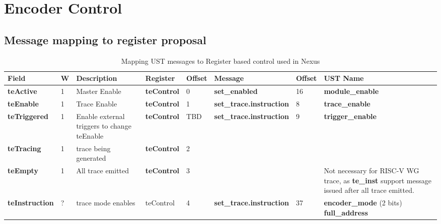 \chapter{Encoder Control} \label{encoderControl}

\section{Message mapping to register proposal} \label{sec:messageToRegiser}

\begin{table}[htp]
  \tiny
  \centering
  \caption{Mapping UST messages to Register based control used in Nexus}
  \label{tab:te_control}
  \begin{tabulary}{\textwidth}{|l|l|p{15mm}|l|p{10mm}|l|p{15mm}|p{15mm}}

    \hline
    {\bf Field} & {\bf W} & {\bf Description} & {\bf Register} & {\bf Offset} & {\bf Message} & {\bf Offset} & {\bf UST Name} \\
    \hline
    \textbf {teActive} & 1 & Master Enable & \textbf {teControl} & 0 & \textbf {set\_enabled} & 16 & \textbf {module\_enable}\\
    \hline  
    \textbf {teEnable} & 1 & Trace Enable & \textbf{teControl} & 1 & \textbf {set\_trace.instruction} & 8 & \textbf {trace\_enable}\\     
    \hline
    \textbf{teTriggered} & 1 & Enable external triggers to change teEnable & \textbf {teControl} & TBD & \textbf {set\_trace.instruction} & 9 & \textbf {trigger\_enable}\\
    \hline
    \textbf{teTracing} & 1 & trace being generated & \textbf{teControl} & 2 & & \\
    \hline
    \textbf{teEmpty} & 1 & All trace emitted & \textbf{teControl} & 3 & & & Not necessary for RISC-V WG trace, as \textbf {te\_inst} support message issued after all trace emitted.\\
    \hline
    \textbf{teInstruction} & ? & trace mode enables & teControl & 4 & \textbf{set\_trace.instruction} & 37\newline & 
    \textbf {encoder\_mode} (2 bits)\newline
    \textbf{full\_address}\newline

\end{tabulary}
\end{table}
